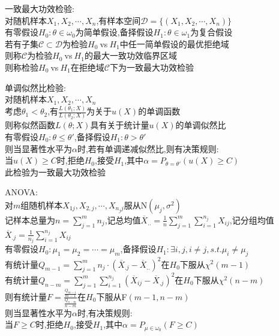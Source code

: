 \begin{dingyi}
一致最大功效检验:\\
对随机样本$X_1,X_2,\cdots,X_n$,有样本空间$\mathcal{D}=\{(X_1,X_2,\cdots,X_n)\}$\\
有零假设$H_0:\theta\in\omega_0$为简单假设,备择假设$H_1:\theta\in\omega_1$为复合假设\\
若有子集$\mathcal{C}\subset\mathcal{D}$为检验$H_0\ $vs$\ H_1$中任一简单假设的最优拒绝域\\
则称$\mathcal{C}$为检验$H_0\ $vs$\ H_1$的最大一致功效临界区域\\
则称检验$H_0\ $vs$\ H_1$在拒绝域$\mathcal{C}$下为一致最大功效检验
\end{dingyi}

\begin{dingyi}
单调似然比检验:\\
对随机样本$X_1,X_2,\cdots,X_n$\\
考虑$\theta_1<\theta_2$,有$\frac{L(\theta_1;X)}{L(\theta_2;X)}$为关于$u(X)$的单调函数\\
则称似然函数$L(\theta;X)$具有关于统计量$u(X)$的单调似然比\\
有零假设$H_0:\theta\leq \theta'$,备择假设$H_1:\theta> \theta'$\\
则当显著性水平为$\alpha$时,若有单调递减似然比,则有决策规则:\\
当$u(X)\geq C$时,拒绝$H_0$,接受$H_1$,其中$\alpha=P_{\theta=\theta'}(u(X)\geq C)$\\
此检验为一致最大功效检验
\end{dingyi}

\begin{dingli}
ANOVA:\\
对$m$组随机样本$X_{1j},X_{2,j},\cdots,X_{n_jj}$服从N$(\mu_{j},\sigma^2)$\\
记样本总量为$n=\sum\limits_{j=1}^{m}n_{j}$,记总均值$\overline{X}_{..}=\frac{1}{n}\sum\limits_{j=1}^{m}\sum\limits_{i=1}^{n_{j}}X_{ij}$,记分组均值$\overline{X}_{.j}=\frac{1}{n_j}\sum\limits_{i=1}^{n_{j}}X_{ij}$\\
有零假设$H_0:\mu_{1}=\mu_{2}=\cdots=\mu_{m}$,备择假设$H_1:\exists i,j,i\neq j,s.t.\mu_{i}\neq\mu_{j}$\\
有统计量$Q_{m-1}=\sum\limits_{j=1}^{m}n_j\cdot(\overline{X}_{.j}-\overline{X}_{..})^2$在$H_0$下服从$\chi^2(m-1)$\\
有统计量$Q_{n-m}=\sum\limits_{j=1}^{m}\sum\limits_{i=1}^{n_j}(\overline{X}_{ij}-\overline{X}_{.j})^2$在$H_0$下服从$\chi^2(n-m)$\\
则有统计量$F=\frac{\frac{Q_{m-1}}{m-1}}{\frac{Q_{n-m}}{n-m}}$在$H_0$下服从F$(m-1,n-m)$\\
则当显著性水平为$\alpha$时,有决策规则:\\
当$F\geq C$时,拒绝$H_0$,接受$H_1$,其中$\alpha=P_{\mu\in\omega_0}(F\geq C)$
\end{dingli}

\endinput
%
